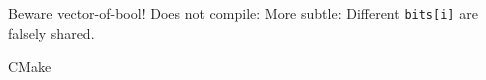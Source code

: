 \begin{numberedframe}{Beware vector-of-bool!}
  Does not compile:
  More subtle:
  Different \lstinline{bits[i]} are falsely shared.
\end{numberedframe}

\begin{numberedframe}{CMake}
  
\end{numberedframe}

